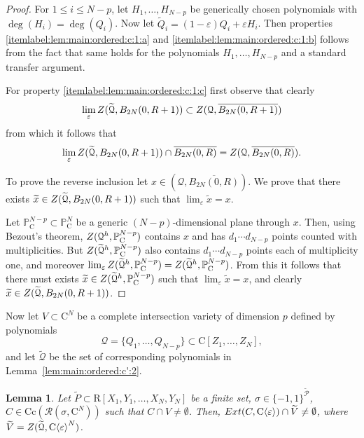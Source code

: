 \documentclass[10pt]{amsart}
\newtheorem{lemma}{Lemma}[section]
\theoremstyle{definition}
\theoremstyle{remark}
\numberwithin{equation}{section}
\newcommand {\R} {\mathrm{R}}
\newcommand {\C}     {\mathrm{C}}
\newcommand {\ZZ} {{\rm Z}}
\newcommand {\RR} {{\mathcal R}}
\newcommand {\la}   {{\langle}}
\newcommand {\ra}   {{\rangle}}
\newcommand {\eps} {{\varepsilon}}
\newcommand {\E} {{\rm Ext}}
\newcommand {\PP}     {\mathbb{P}} %
\newcommand{\Cc}{\mathrm{Cc}}
\begin{document}
\begin{proof}
For $1 \leq i \leq N-p$,  let $H_1,\ldots,H_{N-p}$ be  
generically chosen polynomials with $\deg(H_i) = \deg(Q_i)$. Now let
$\widetilde{Q}_i = (1-\eps)Q_i + \eps H_i$. Then properties 
\eqref{itemlabel:lem:main:ordered:c:1:a} and \eqref{itemlabel:lem:main:ordered:c:1:b} follows from the fact that
same holds for the polynomials $H_1,\ldots,H_{N-p}$ and a standard 
transfer argument.

For property \eqref{itemlabel:lem:main:ordered:c:1:c} first observe that clearly 
\[
\lim_\eps \ZZ(\widetilde{\mathcal{Q}},B_{2N}(0,R+1)) \subset \ZZ(\mathcal{Q},\overline{B_{2N}(0,R+1)})
\]
from which it follows that 
\[
\lim_\eps \ZZ(\widetilde{\mathcal{Q}},B_{2N}(0,R+1)) \cap \overline{B_{2N}(0,R)} = \ZZ(\mathcal{Q},\overline{B_{2N}(0,R)}).
\]

To prove the reverse inclusion let $x \in (\mathcal{Q},\overline{B_{2N}(0,R)})$. We prove that there exists $\widetilde{x} \in \ZZ(\widetilde{\mathcal{Q}},B_{2N} (0,R+1))$ such that 
$\lim_\eps \widetilde{x} = x$.

Let $\PP^{N-p}_\C \subset \PP^{N}_\C$ be a generic $(N-p)$-dimensional plane through $x$. Then, using Bezout's theorem,  
$\ZZ(\mathcal{Q}^h,\PP^{N-p}_\C)$ contains $x$ and has 
$d_1 \cdots d_{N-p}$ points counted with multiplicities. 
But $\ZZ(\widetilde{\mathcal{Q}}^h,\PP^{N-p}_\C)$ also contains
$d_1 \cdots d_{N-p}$ points each of multiplicity one, and moreover
$\lim_\eps \ZZ(\widetilde{\mathcal{Q}}^h,\PP^{N-p}_\C) = \ZZ(\widetilde{\mathcal{Q}}^h,\PP^{N-p}_\C)$. From this it follows that
there must exists $\widetilde{x} \in \ZZ(\widetilde{\mathcal{Q}}^h,\PP^{N-p}_\C)$ such that $\lim_\eps \widetilde{x} = x$, and clearly
$\widetilde{x} \in \ZZ(\widetilde{\mathcal{Q}},B_{2N}(0,R+1))$.
\end{proof}

Now let $V \subset \C^N$ be a complete intersection variety of dimension $p$ defined by polynomials  
\[
\mathcal{Q} = \{Q_1,\ldots,Q_{N-p}\} \subset \C[Z_1,\ldots,Z_N],
\]
and let $\widetilde{\mathcal{Q}}$ be the set of corresponding polynomials
in Lemma~\ref{lem:main:ordered:c':2}.


\begin{lemma}
\label{lem:main:ordered:c':3}
    Let $\widetilde{P} \subset \R[X_1,Y_1,\ldots,X_N,Y_N]$ be a finite set, $\sigma \in 
    \{-1,1\}^{\widetilde{\mathcal{P}}}$, $C \in \Cc(\RR(\sigma,\C^N))$ such that $C \cap V \neq \emptyset$. Then, 
    $\E(C,\C\la\eps\ra) \cap \widetilde{V} \neq \emptyset$,
    where $\widetilde{V} = \ZZ(\widetilde{\mathcal{Q}},\C\la\eps\ra^N)$.
\end{lemma}
\end{document}
